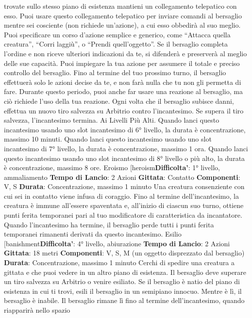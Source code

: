 \begin{multicols}{2}
trovate sullo stesso piano di esistenza mantieni un
collegamento telepatico con esso. Puoi usare questo
collegamento telepatico per inviare comandi al
bersaglio mentre sei cosciente (non richiede un’azione),
a cui esso obbedirà al suo meglio. Puoi specificare un
corso d’azione semplice e generico, come “Attacca
quella creatura”, “Corri laggiù”, o “Prendi quell’oggetto”.
Se il bersaglio completa l’ordine e non riceve ulteriori
indicazioni da te, si difenderà e preserverà al meglio
delle sue capacità.
Puoi impiegare la tua azione per assumere il totale e
preciso controllo del bersaglio. Fino al termine del tuo
prossimo turno, il bersaglio effettuerà solo le azioni
decise da te, e non farà nulla che tu non gli permetta di
fare. Durante questo periodo, puoi anche far usare una
reazione al bersaglio, ma ciò richiede l’uso della tua
reazione.
Ogni volta che il bersaglio subisce danni, effettua un
nuovo tiro salvezza su Arbitrio contro l’incantesimo.
Se supera il tiro salvezza, l’incantesimo termina.
Ai Livelli Più Alti. Quando lanci questo incantesimo
usando uno slot incantesimo di 6° livello, la durata è
concentrazione, massimo 10 minuti. Quando lanci
questo incantesimo usando uno slot incantesimo di 7°
livello, la durata è concentrazione, massimo 1 ora.
Quando lanci questo incantesimo usando uno slot
incantesimo di 8° livello o più alto, la durata è
concentrazione, massimo 8 ore.
Eroismo
[heroism\textbf{Difficolta'}:
1° livello, ammaliamento
\textbf{Tempo di Lancio}: 2 Azioni
\textbf{Gittata}: Contatto
\textbf{Componenti}: V, S
\textbf{Durata}: Concentrazione, massimo 1 minuto
Una creatura consenziente con cui sei in contatto viene
infusa di coraggio. Fino al termine dell’incantesimo, la
creatura è immune all’essere spaventata e, all’inizio di
ciascun suo turno, ottiene punti ferita temporanei pari al
tuo modificatore di caratteristica da incantatore.
Quando l’incantesimo ha termine, il bersaglio perde tutti 
i punti ferita temporanei rimanenti derivati da questo
incantesimo.
Esilio
[banishment\textbf{Difficolta'}:
4° livello, abiurazione
\textbf{Tempo di Lancio}: 2 Azioni
\textbf{Gittata}: 18 metri
\textbf{Componenti}: V, S, M (un oggetto disprezzato dal
bersaglio)
\textbf{Durata}: Concentrazione, massimo 1 minuto
Cerchi di spedire una creatura a gittata e che puoi
vedere in un altro piano di esistenza. Il bersaglio deve
superare un tiro salvezza su Arbitrio o venire esiliato.
Se il bersaglio è natio del piano di esistenza in cui ti
trovi, esili il bersaglio in un semipiano innocuo. Mentre è
lì, il bersaglio è inabile. Il bersaglio rimane lì fino al
termine dell’incantesimo, quando riapparirà nello spazio

\end{multicols}
